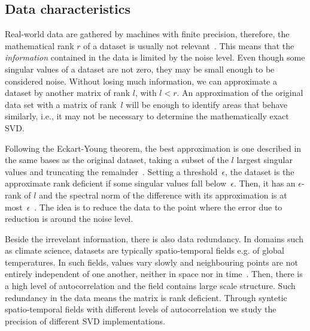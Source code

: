 \documentclass[ijgi,article,submit,moreauthors,pdftex,10pt,a4paper]{Definitions/mdpi}
\begin{document}
\subsection{Data characteristics}
Real-world data are gathered by machines with finite precision, therefore, the mathematical rank $r$ of a dataset is usually not relevant~\cite{Martinsson2016}. This means that the \textit{information} contained in the data is limited by the noise level. Even though some singular values of a dataset are not zero, they may be small enough to be considered noise. Without losing much information, we can approximate a dataset by another matrix of rank $l$, with $l < r$. An approximation of the original data set with a matrix of rank~$l$ will be enough to identify areas that behave similarly, i.e., it may not be necessary to determine the mathematically exact SVD. 

Following the Eckart-Young theorem, the best approximation is one described in the same bases as the original dataset, taking a subset of the $l$ largest singular values and truncating the remainder~\cite{Eckart1936}. Setting a threshold~$\epsilon$, the dataset is the approximate rank deficient if some singular values fall below~$\epsilon$. Then, it has an $\epsilon$-rank of $l$ and the spectral norm of the difference with its approximation is at most~$\epsilon$~\cite{Martinsson2016}. The idea is to reduce the data to the point where the error due to reduction is around the noise level. 

Beside the irrevelant information, there is also data redundancy. In domains such as climate science, datasets are typically spatio-temporal fields e.g. of global temperatures. In such fields, values vary slowly and neighbouring points are not entirely independent of one another, neither in space nor in time~\cite{Eshel2011}. Then, there is a high level of autocorrelation and the field contains large scale structure. Such redundancy in the data means the matrix is rank deficient. Through syntetic spatio-temporal fields with different levels of autocorrelation we study the precision of different SVD implementations.
\end{document}

